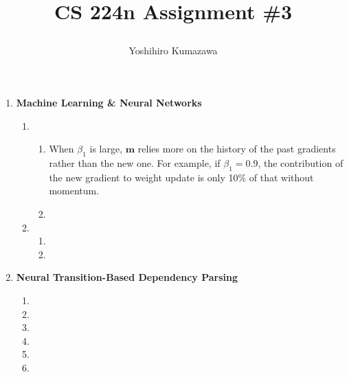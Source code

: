 \documentclass[12pt, dvipdfmx]{article}
\title{
  \vspace{-2cm}
  CS 224n Assignment \#3 \\
  \author{Yoshihiro Kumazawa}
}
\begin{document}
\maketitle
\begin{enumerate}[label=\textbf{\arabic*.}]
\item \textbf{Machine Learning \& Neural Networks}
\begin{enumerate}[label=(\alph*)]
\item
\begin{enumerate}[label=\roman*.]
\item When $\beta_1$ is large, $\bm{m}$ relies more on the history of the past gradients rather than the new one. For example, if $\beta_1=0.9$, the contribution of the new gradient to weight update is only 10\% of that without momentum.
\item
\end{enumerate}
\item
\begin{enumerate}[label=\roman*.]
\item
\item
\end{enumerate}
\end{enumerate}
\item \textbf{Neural Transition-Based Dependency Parsing}
\begin{enumerate}[label=(\alph*)]
\item
\item
\item
\item
\item
\item
\end{enumerate}
\end{enumerate}
\end{document}
